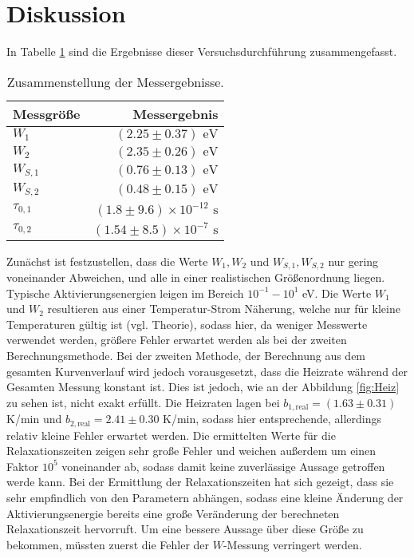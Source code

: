 

\section{Diskussion}
In Tabelle \ref{tab:Diskussion} sind die Ergebnisse dieser Versuchsdurchführung
zusammengefasst.

\begin{table}[h]
\centering
\begin{tabular}{lr}
\toprule \midrule
Messgröße & Messergebnis\\
\midrule

$W_1$ &$ (2.25 \pm 0.37) \text{ eV}$ \\

$W_2 $& $(2.35\pm 0.26) \text{ eV}$ \\

$W_{S,1}$ &$ (0.76\pm 0.13) \text{ eV}$ \\

$W_{S,2}$ &$ (0.48\pm 0.15) \text{ eV}$ \\

$\tau_{0,1}$ & $(1.8 \pm 9.6) \times 10^{-12}\text{ s}$ \\

$\tau_{0,2} $& $(1.54 \pm 8.5) \times 10^{-7}\text{ s} $\\
\midrule \bottomrule
\end{tabular}
\caption{Zusammenstellung der Messergebnisse.}
\label{tab:Diskussion}
\end{table}

Zunächst ist festzustellen, dass die Werte $W_1,W_2$ und $W_{S,1},W_{S,2}$ nur gering voneinander 
Abweichen, und alle in einer realistischen Größenordnung liegen. Typische Aktivierungsenergien 
leigen im Bereich $10^{-1}-10^1$ eV. Die Werte $W_1$ und $W_2$ resultieren aus einer 
Temperatur-Strom Näherung, welche nur für kleine Temperaturen gültig ist (vgl. Theorie), sodass 
hier, da weniger Messwerte verwendet werden, größere Fehler erwartet werden als bei der 
zweiten Berechnungsmethode. Bei der zweiten Methode, der Berechnung aus dem gesamten 
Kurvenverlauf wird jedoch vorausgesetzt, dass die Heizrate während der Gesamten Messung konstant 
ist. Dies ist jedoch, wie an der Abbildung \ref{fig:Heiz} zu sehen ist, nicht exakt erfüllt. 
Die Heizraten lagen bei $b_{1,\text{real}}=(1.63\pm 0.31)$ K/min und $b_{2,\text{real}}=2.41\pm 
0.30$ K/min, sodass hier entsprechende, allerdings relativ kleine Fehler erwartet werden. Die 
ermittelten Werte für die Relaxationszeiten zeigen sehr große Fehler und weichen außerdem 
um einen Faktor $10^5$ voneinander ab, sodass damit keine zuverlässige Aussage getroffen 
werde kann. Bei der Ermittlung der Relaxationszeiten hat sich gezeigt, dass sie sehr 
empfindlich von den Parametern abhängen, sodass eine kleine Änderung der Aktivierungsenergie 
bereits eine große Veränderung der berechneten Relaxationszeit hervorruft. Um eine bessere 
Aussage über diese Größe zu bekommen, müssten zuerst die Fehler der $W$-Messung verringert 
werden.